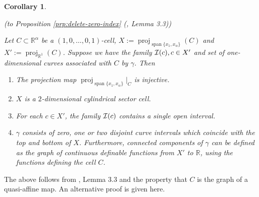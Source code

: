 \documentclass[
]{book}
\newtheorem{corollary}{Corollary}[chapter]
\theoremstyle{definition}
\theoremstyle{definition}
\theoremstyle{definition}
\theoremstyle{definition}
\theoremstyle{remark}
\begin{document}
\begin{corollary}
\protect\hypertarget{cor:gamma-top-bottom}{}\label{cor:gamma-top-bottom}

(to Proposition \ref{prp:delete-zero-index} (\citet{bgv15}, Lemma 3.3))

Let \(C\subset \mathbb{R}^\alpha\) be a \((1,0,\ldots,0,1)\)-cell, \(X := {\operatorname{proj}_{{\operatorname{span} \{x_1,x_\alpha\}}}} (C)\) and \(X' := {\operatorname{proj}_{\mathbb{R}^{1}}}(C)\). Suppose we have the family \({\cal I}(c), c \in X'\) and set of one-dimensional curves associated with \(C\) by \(\gamma\). Then

\begin{enumerate}
\def\labelenumi{\arabic{enumi}.}
\item
  The projection map \({\operatorname{proj}_{{\operatorname{span} \{x_1,x_\alpha\}}}}\vert_C\) is injective.
\item
  \(X\) is a \(2\)-dimensional cylindrical sector cell.
\item
  For each \(c \in X'\), the family \({\cal I}(c)\) contains a single open interval.
\item
  \(\gamma\) consists of zero, one or two disjoint curve intervals which coincide with the top and bottom of \(X\). Furthermore, connected components of \(\gamma\) can be defined as the graph of continuous definable functions from \(X'\) to \(\mathbb{R}\), using the functions defining the cell \(C\).
\end{enumerate}

\end{corollary}

The above follows from \citet{bgv15}, Lemma 3.3 and the property that \(C\) is the graph of a quasi-affine map. An alternative proof is given here.
\end{document}
